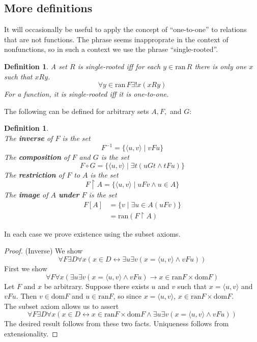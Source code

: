 \documentclass{report}
\newtheorem{definition}[theo]{Definition}
\begin{document}
\subsection{More definitions}
It will occasionally be useful to apply the concept of ``one-to-one'' to relations that are not functions. The phrase seems inapproprate in the context of nonfunctions, so in such a context we use
the phrase ``single-rooted''.
\begin{definition}
A set $R$ is \textit{single-rooted} iff for each $y\in\text{ran}\,R$ there is only one $x$ such that $xRy$.
\begin{equation*}
\forall y\in\text{ran}\,F\exists!x(xRy)
\end{equation*}
For a function, it is single-rooted iff it is one-to-one.
\end{definition}
\noindent The following can be defined for arbitrary sets $A,F,$ and $G$:
\begin{definition}\hspace{1mm}\\
The \textbf{inverse} of $F$ is the set
\begin{equation*}
F^{-1}=\{\langle u,v\rangle\mid vFu\}
\end{equation*}
The \textbf{composition} of $F$ and $G$ is the set
\begin{equation*}
F\circ G=\{\langle u,v\rangle\mid\exists t(uGt\land tFu)\}
\end{equation*}
The \textbf{restriction} of $F$ to $A$ is the set
\begin{equation*}
F\restriction A=\{\langle u,v\rangle\mid uFv\land u\in A\}
\end{equation*}
The \textbf{image} of $A$ \textbf{under} $F$ is the set
\begin{align*}
F[A]&=\{v\mid\exists u\in A(uFv)\}\\
&=\text{ran}(F\restriction A)
\end{align*}
\end{definition}
\noindent In each case we prove existence using the subset axioms.
\begin{proof}(Inverse)
We show 
\begin{equation*}
\forall F\exists D\forall x(x\in D\leftrightarrow\exists u\exists v(x=\langle u,v\rangle\land vFu))
\end{equation*}
First we show
\begin{equation*}
\forall F\forall x(\exists u\exists v(x=\langle u,v\rangle\land vFu)\to x\in\text{ran}F\times\text{dom}F)
\end{equation*}
Let $F$ and $x$ be arbitrary. Suppose there exists $u$ and $v$ such that $x=\langle u,v\rangle$ and $vFu$. Then $v\in\text{dom}F$ and $u\in\text{ran}F$, so since $x=\langle u,v\rangle$,
$x\in\text{ran}F\times\text{dom}F$.\\
\indent The subset axiom allows us to assert
\begin{equation*}
\forall F\exists D\forall x(x\in D\leftrightarrow x\in\text{ran}F\times\text{dom}F\land\exists u\exists v(x=\langle u,v\rangle\land vFu))
\end{equation*}
The desired result follows from these two facts. Uniqueness follows from extensionality.
\end{proof}
\end{document}
